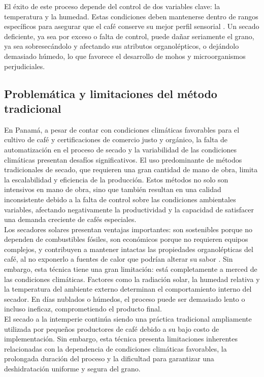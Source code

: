 \documentclass[12pt]{article}
\begin{document}
El éxito de este proceso depende del control de dos variables clave: la temperatura y la humedad. Estas condiciones deben mantenerse dentro de rangos específicos para asegurar que el café conserve su mejor perfil sensorial \cite{safri2021status}\cite{kudalkar2021smartdryer}. Un secado deficiente, ya sea por exceso o falta de control, puede dañar seriamente el grano, ya sea sobresecándolo y afectando sus atributos organolépticos, o dejándolo demasiado húmedo, lo que favorece el desarrollo de mohos y microorganismos perjudiciales.\\

\subsection{Problemática y limitaciones del método tradicional}


En Panamá, a pesar de contar con condiciones climáticas favorables para el cultivo de café y certificaciones de comercio justo y orgánico, la falta de automatización en el proceso de secado y la variabilidad de las condiciones climáticas presentan desafíos significativos. El uso predominante de métodos tradicionales de secado, que requieren una gran cantidad de mano de obra, limita la escalabilidad y eficiencia de la producción. Estos métodos no solo son intensivos en mano de obra, sino que también resultan en una calidad inconsistente debido a la falta de control sobre las condiciones ambientales variables, afectando negativamente la productividad y la capacidad de satisfacer una demanda creciente de cafés especiales.\\


Los secadores solares presentan ventajas importantes: son sostenibles porque no dependen de combustibles fósiles, son económicos porque no requieren equipos complejos, y contribuyen a mantener intactas las propiedades organolépticas del café, al no exponerlo a fuentes de calor que podrían alterar su sabor \cite{bradford2018drychain}\cite{srinivasan2021greenhouse}. Sin embargo, esta técnica tiene una gran limitación: está completamente a merced de las condiciones climáticas. Factores como la radiación solar, la humedad relativa y la temperatura del ambiente externo determinan el comportamiento interno del secador. En días nublados o húmedos, el proceso puede ser demasiado lento o incluso ineficaz, comprometiendo el producto final.\\

El secado a la intemperie continúa siendo una práctica tradicional ampliamente utilizada por pequeños productores de café debido a su bajo costo de implementación. Sin embargo, esta técnica presenta limitaciones inherentes relacionadas con la dependencia de condiciones climáticas favorables, la prolongada duración del proceso y la dificultad para garantizar una deshidratación uniforme y segura del grano.\\
\end{document}

